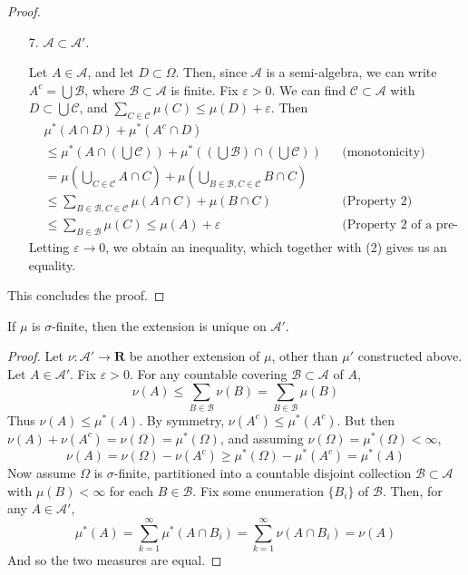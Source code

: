 \begin{proof}
\begin{enumerate}
        \item[7.] $\mathcal{A} \subset \mathcal{A}'$.
        \begin{proof*}
            Let $A \in \mathcal{A}$, and let $D \subset \Omega$. Then, since $\mathcal{A}$ is a semi-algebra, we can write $A^c = \bigcup \mathcal{B}$, where $\mathcal{B} \subset \mathcal{A}$ is finite. Fix $\varepsilon > 0$. We can find $\mathcal{C} \subset \mathcal{A}$ with $D \subset \bigcup \mathcal{C}$, and $\sum_{C \in \mathcal{C}} \mu(C) \leq \mu(D) + \varepsilon$. Then
            \begin{align*}
                &\mu^*(A \cap D) + \mu^*(A^c \cap D)\\
                &\leq \mu^*\left(A \cap \left(\bigcup \mathcal{C}\right)\right) + \mu^*\left(\left(\bigcup \mathcal{B}\right) \cap \left(\bigcup \mathcal{C}\right)\right) && \text{(monotonicity)}\\
                &= \mu\left(\bigcup_{C \in \mathcal{C}} A \cap C\right) + \mu\left( \bigcup_{B \in \mathcal{B}, C \in \mathcal{C}} B \cap C \right)\\
                &\leq \sum_{B \in \mathcal{B}, C \in \mathcal{C}} \mu(A \cap C) + \mu(B \cap C) && \text{(Property 2)}\\
                &\leq \sum_{B \in \mathcal{B}} \mu(C) \leq \mu(A) + \varepsilon && \text{(Property 2 of a pre-measure)}
            \end{align*}
            Letting $\varepsilon \to 0$, we obtain an inequality, which together with (2) gives us an equality.
        \end{proof*}
    \end{enumerate}
    This concludes the proof.
\end{proof}

\begin{corollary}
    If $\mu$ is $\sigma$-finite, then the extension is unique on $\mathcal{A}'$.
\end{corollary}
\begin{proof}
    Let $\nu: \mathcal{A}' \to \mathbf{R}$ be another extension of $\mu$, other than $\mu'$ constructed above. Let $A \in \mathcal{A}'$. Fix $\varepsilon > 0$. For any countable covering $\mathcal{B} \subset \mathcal{A}$ of $A$,
    \[ \nu(A) \leq \sum_{B \in \mathcal{B}} \nu(B) = \sum_{B \in \mathcal{B}} \mu(B) \]
    Thus $\nu(A) \leq \mu^*(A)$. By symmetry, $\nu(A^c) \leq \mu^*(A^c)$. But then $\nu(A) + \nu(A^c) = \nu(\Omega) = \mu^*(\Omega)$, and assuming $\nu(\Omega) = \mu^*(\Omega) < \infty$,
    \[ \nu(A) = \nu(\Omega) - \nu(A^c) \geq \mu^*(\Omega) - \mu^*(A^c) = \mu^*(A) \]
    Now assume $\Omega$ is $\sigma$-finite, partitioned into a countable disjoint collection $\mathcal{B} \subset \mathcal{A}$ with $\mu(B) < \infty$ for each $B \in \mathcal{B}$. Fix some enumeration $\{ B_i \}$ of $\mathcal{B}$. Then, for any $A \in \mathcal{A}'$,
    \[ \mu^*(A) = \sum_{k = 1}^\infty \mu^*(A \cap B_i) = \sum_{k = 1}^\infty \nu(A \cap B_i) = \nu(A) \]
    And so the two measures are equal.
\end{proof}

